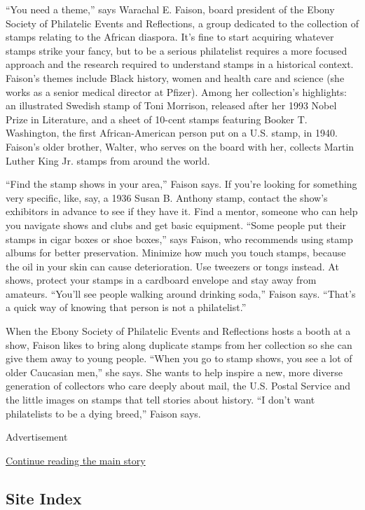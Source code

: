 ``You need a theme,'' says Warachal E. Faison, board president of the
Ebony Society of Philatelic Events and Reflections, a group dedicated to
the collection of stamps relating to the African diaspora. It's fine to
start acquiring whatever stamps strike your fancy, but to be a serious
philatelist requires a more focused approach and the research required
to understand stamps in a historical context. Faison's themes include
Black history, women and health care and science (she works as a senior
medical director at Pfizer). Among her collection's highlights: an
illustrated Swedish stamp of Toni Morrison, released after her 1993
Nobel Prize in Literature, and a sheet of 10-cent stamps featuring
Booker T. Washington, the first African-American person put on a U.S.
stamp, in 1940. Faison's older brother, Walter, who serves on the board
with her, collects Martin Luther King Jr. stamps from around the world.

``Find the stamp shows in your area,'' Faison says. If you're looking
for something very specific, like, say, a 1936 Susan B. Anthony stamp,
contact the show's exhibitors in advance to see if they have it. Find a
mentor, someone who can help you navigate shows and clubs and get basic
equipment. ``Some people put their stamps in cigar boxes or shoe
boxes,'' says Faison, who recommends using stamp albums for better
preservation. Minimize how much you touch stamps, because the oil in
your skin can cause deterioration. Use tweezers or tongs instead. At
shows, protect your stamps in a cardboard envelope and stay away from
amateurs. ``You'll see people walking around drinking soda,'' Faison
says. ``That's a quick way of knowing that person is not a
philatelist.''

When the Ebony Society of Philatelic Events and Reflections hosts a
booth at a show, Faison likes to bring along duplicate stamps from her
collection so she can give them away to young people. ``When you go to
stamp shows, you see a lot of older Caucasian men,'' she says. She wants
to help inspire a new, more diverse generation of collectors who care
deeply about mail, the U.S. Postal Service and the little images on
stamps that tell stories about history. ``I don't want philatelists to
be a dying breed,'' Faison says.

Advertisement

\protect\hyperlink{after-bottom}{Continue reading the main story}

\hypertarget{site-index}{%
\subsection{Site Index}\label{site-index}}

